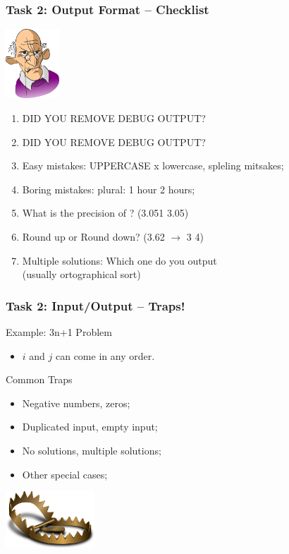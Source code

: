 \begin{frame}
  \frametitle{Task 2: Output Format -- Checklist}

  \includegraphics[width=0.15\textwidth]{../img/angryclient}
  \begin{enumerate}
    \item DID YOU REMOVE DEBUG OUTPUT?
    \item DID YOU REMOVE DEBUG OUTPUT?
    \smallskip

    \item Easy mistakes: UPPERCASE x lowercase, spleling mitsakes;
    \item Boring mistakes: plural: 1 hour  2 hours;
    \item What is the precision of ? (3.051  3.05)
    \item Round up or Round down? (3.62 $\rightarrow$ 3  4)
    \item Multiple solutions: Which one do you output\\ (usually ortographical sort)
  \end{enumerate}
\end{frame}


\begin{frame}
  \frametitle{Task 2: Input/Output -- Traps!}

  \begin{block}{Example: 3n+1 Problem}
    \begin{itemize}
    \item $i$ and $j$ can come in any order.
    \end{itemize}
  \end{block}

  \begin{block}{Common Traps}
    \begin{itemize}
    \item Negative numbers, zeros;
    \item Duplicated input, empty input;
    \item No solutions, multiple solutions;
    \item Other special cases;
    \end{itemize}
  \end{block}
  \vfill

  \hfill \includegraphics[width=0.25\textwidth]{../img/trap}
\end{frame}

